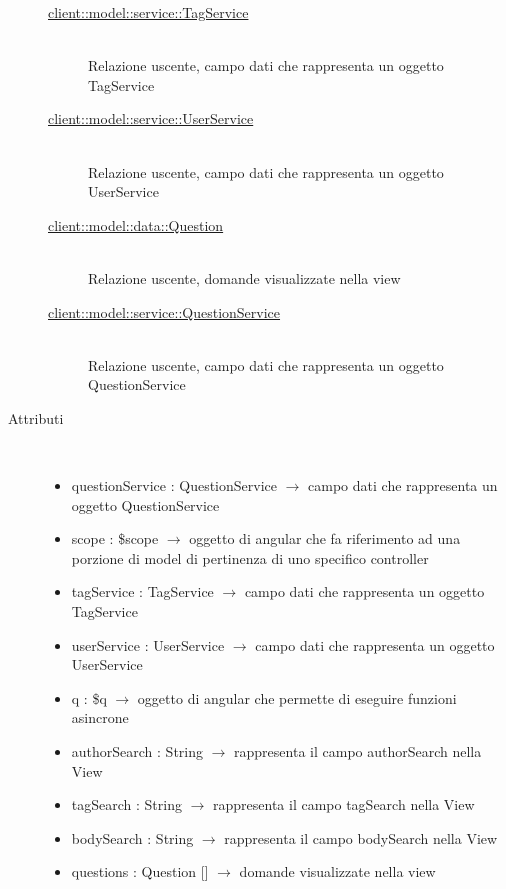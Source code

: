\begin{description}
\begin{description}
	\item[\hyperlink{client::model::service::TagService}{client::model::service::TagService}] \hfill \\
	Relazione uscente, campo dati che rappresenta un oggetto TagService
	\item[\hyperlink{client::model::service::UserService}{client::model::service::UserService}] \hfill \\
	Relazione uscente, campo dati che rappresenta un oggetto UserService
	\item[\hyperlink{client::model::data::Question}{client::model::data::Question}] \hfill \\
	Relazione uscente, domande visualizzate nella view
	\item[\hyperlink{client::model::service::QuestionService}{client::model::service::QuestionService}] \hfill \\
	Relazione uscente, campo dati che rappresenta un oggetto QuestionService
\end{description}

\item[Attributi] \hfill \\
\vspace{-7mm}
\begin{itemize}
	\item questionService : QuestionService $\rightarrow$ campo dati che rappresenta un oggetto QuestionService
	\item scope : \$scope $\rightarrow$ oggetto di angular che fa riferimento ad una porzione di model di pertinenza di uno specifico controller
	\item tagService : TagService $\rightarrow$ campo dati che rappresenta un oggetto TagService
	\item userService : UserService $\rightarrow$ campo dati che rappresenta un oggetto UserService
	\item q : \$q $\rightarrow$ oggetto di angular che permette di eseguire funzioni asincrone
	\item authorSearch : String $\rightarrow$ rappresenta il campo authorSearch nella View
	\item tagSearch : String $\rightarrow$ rappresenta il campo tagSearch nella View
	\item bodySearch : String $\rightarrow$ rappresenta il campo bodySearch nella View
	\item questions : Question [] $\rightarrow$ domande visualizzate nella view
\end{itemize}


\end{description}
